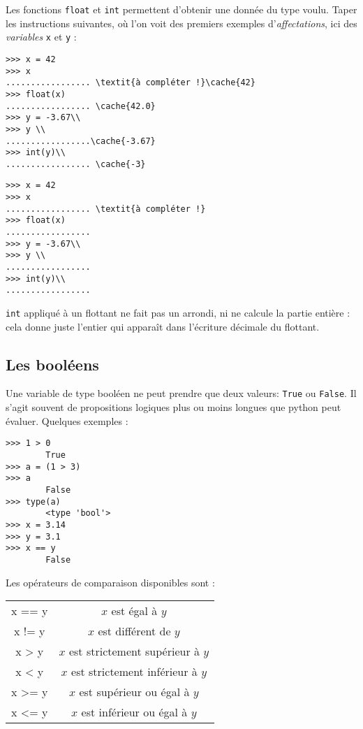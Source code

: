 \begin{multicols}{2}
Les fonctions \texttt{float} et \texttt{int} permettent d'obtenir une donnée du type voulu. Taper les instructions suivantes, où l'on voit des premiers exemples d'\emph{affectations}, ici des \emph{variables} \texttt{x} et \texttt{y} : 
\ifprof
\begin{lstlisting}
>>> x = 42
>>> x 
................. \textit{à compléter !}\cache{42}
>>> float(x)
................. \cache{42.0} 
>>> y = -3.67\\
>>> y \\
.................\cache{-3.67} 
>>> int(y)\\
................. \cache{-3}
\end{lstlisting}
\else
\begin{lstlisting}
>>> x = 42
>>> x 
................. \textit{à compléter !}
>>> float(x)
................. 
>>> y = -3.67\\
>>> y \\
.................
>>> int(y)\\
.................
\end{lstlisting}
\fi

\begin{warn}
 \texttt{int} appliqué à un flottant ne fait pas un arrondi, ni ne calcule la partie entière : cela donne juste l'entier qui apparaît dans l'écriture décimale du flottant.\
 \end{warn}




\subsection*{Les booléens}

Une variable de type booléen ne peut prendre que deux valeurs: \texttt{True} ou \texttt{False}. Il s'agit souvent de propositions logiques plus ou moins longues que python peut évaluer. 
 Quelques exemples : 
\begin{lstlisting} 
>>> 1 > 0
        True
>>> a = (1 > 3)
>>> a
        False 
>>> type(a)
        <type 'bool'>
>>> x = 3.14
>>> y = 3.1
>>> x == y 
        False
\end{lstlisting}

Les opérateurs de comparaison disponibles sont :

\begin{center}
\begin{tabular}{>{\ttfamily}cc}
\hline
x == y&$x$ est égal à $y$\\
x != y & $x$ est différent de $y$\\
x > y & $x$ est strictement supérieur à $y$\\
x < y & $x$ est strictement inférieur à $y$\\
x >= y& $x$ est supérieur ou égal à $y$\\
x <= y& $x$ est inférieur ou égal à $y$\\
\hline
\end{tabular}
\end{center}


\end{multicols}
